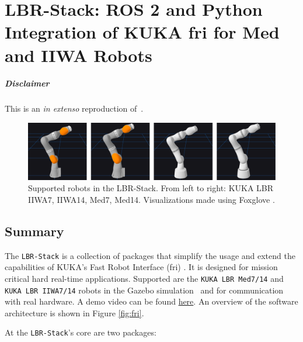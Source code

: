 \chapter[LBR-Stack]{LBR-Stack: ROS 2 and Python Integration of KUKA \acrshort{fri} for Med and
IIWA Robots}
\label{app:lbr_stack}
\minitoc

\paragraph{Disclaimer} This  is an \textit{in extenso} reproduction of~\cite{huber2023lbr}.

\newpage

\begin{figure}
\centering
\includegraphics[width=\textwidth]{appendix_a/img/joss_figure.png}
\caption[Supported robots in the LBR-Stack. From left to right: KUKA LBR
IIWA7, IIWA14, Med7, Med14. Visualizations made using Foxglove
.]{Supported robots in the LBR-Stack. From left to right: KUKA LBR
IIWA7, IIWA14, Med7, Med14. Visualizations made using Foxglove
\footnotemark{}.}
\end{figure}

\hypertarget{summary}{%
\section{Summary}\label{summary}}
The \texttt{LBR-Stack} is a collection of packages that simplify the
usage and extend the capabilities of KUKA's Fast Robot Interface (\acrshort{fri})
\cite{ref-fri}. It is designed
for mission critical hard real-time applications. Supported are the
\texttt{KUKA\ LBR\ Med7/14} and \texttt{KUKA\ LBR\ IIWA7/14} robots in
the Gazebo simulation~\cite{ref-gazebo} and for communication with real hardware. A demo video can be
found
\href{https://www.linkedin.com/posts/mhubii_robotics-opensource-ros2-activity-7009974676017848320-S3U5/?utm_source=share\&utm_medium=member_desktop}{here}.
An overview of the software architecture is shown in Figure
\ref{fig:fri}.

At the \texttt{LBR-Stack}'s core are two packages:

